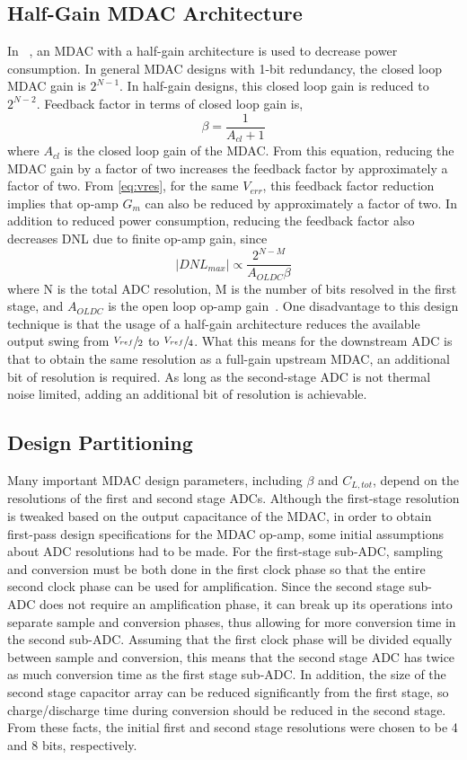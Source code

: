 \subsection{Half-Gain MDAC Architecture}
In ~\cite{5714725}, an MDAC with a half-gain architecture is used to decrease power consumption. In general MDAC designs with 1-bit redundancy, the closed loop MDAC gain is $2^{N-1}$. In half-gain designs, this closed loop gain is reduced to $2^{N-2}$. Feedback factor in terms of closed loop gain is,
\begin{equation}
\label{eq:betacla}
\beta = \dfrac{1}{A_{cl}+1}
\end{equation}
where $A_{cl}$ is the closed loop gain of the MDAC. From this equation, reducing the MDAC gain by a factor of two increases the feedback factor by approximately a factor of two. From \ref{eq:vres}, for the same $V_{err}$, this feedback factor reduction implies that op-amp $G_m$ can also be reduced by approximately a factor of two. In addition to reduced power consumption, reducing the feedback factor also decreases DNL due to finite op-amp gain, since
\begin{equation}
\label{eq:dnlfinitegain}
|DNL_{max}|\propto \dfrac{2^{N-M}}{A_{OLDC}\beta}
\end{equation}
where N is the total ADC resolution, M is the number of bits resolved in the first stage, and $A_{OLDC}$ is the open loop op-amp gain~\cite{5714725}. One disadvantage to this design technique is that the usage of a half-gain architecture reduces the available output swing from $\sfrac{V_{ref}}{2}$ to $\sfrac{V_{ref}}{4}$. What this means for the downstream ADC is that to obtain the same resolution as a full-gain upstream MDAC, an additional bit of resolution is required. As long as the second-stage ADC is not thermal noise limited, adding an additional bit of resolution is achievable.
\subsection{Design Partitioning}
Many important MDAC design parameters, including $\beta$ and $C_{L,tot}$, depend on the resolutions of the first and second stage ADCs. Although the first-stage resolution is tweaked based on the output capacitance of the MDAC, in order to obtain first-pass design specifications for the MDAC op-amp, some initial assumptions about ADC resolutions had to be made. For the first-stage sub-ADC, sampling and conversion must be both done in the first clock phase so that the entire second clock phase can be used for amplification. Since the second stage sub-ADC does not require an amplification phase, it can break up its operations into separate sample and conversion phases, thus allowing for more conversion time in the second sub-ADC. Assuming that the first clock phase will be divided equally between sample and conversion, this means that the second stage ADC has twice as much conversion time as the first stage sub-ADC. In addition, the size of the second stage capacitor array can be reduced significantly from the first stage, so charge/discharge time during conversion should be reduced in the second stage. From these facts, the initial first and second stage resolutions were chosen to be 4 and 8 bits, respectively.  
